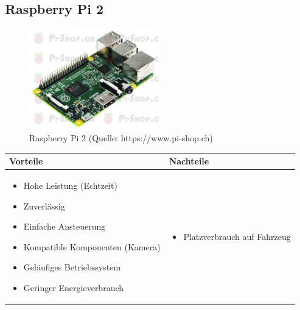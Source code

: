 \pagebreak


\subsection{Raspberry Pi 2}

\begin{figure}[h!]%
\centering
\includegraphics[width=0.5\textwidth]{fig/PI2.jpg}
\caption{Raspberry Pi 2 (Quelle: https://www.pi-shop.ch)}
\label{fig:PI2}
\end{figure}

\begin{table}[h]
\begin{tabular}{p{} | p{}}


 \textbf{Vorteile} & \textbf{Nachteile} \\ \hline
	 
\begin{itemize}
\item Hohe Leistung (Echtzeit)
\item Zuverlässig
\item Einfache Ansteuerung
\item Kompatible Komponenten (Kamera)
\item Geläufiges Betriebssystem
\item Geringer Energieverbrauch
\end{itemize}

 
 &
 
\begin{itemize}
\item Platzverbrauch auf Fahrzeug
\end{itemize}

\end{tabular}
\end{table}

